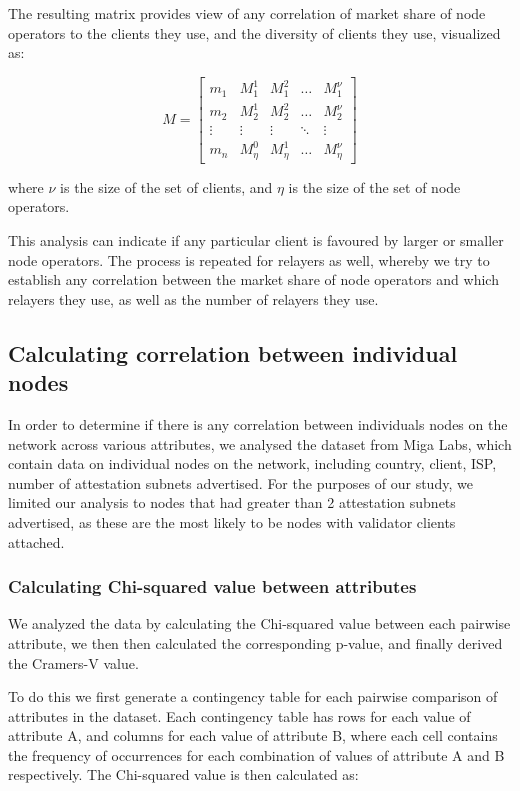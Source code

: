 \documentclass[conference]{IEEEtran}
\begin{document}
The resulting matrix provides view of any correlation of market share of node operators to the clients they use, and the diversity of clients they use, visualized as:

\[
M = \begin{bmatrix}
m_1 & M_1^1 & M_1^2 & \ldots & M_1^{\nu} \\
m_2 & M_2^1 & M_2^2 & \ldots & M_2^{\nu} \\
\vdots & \vdots & \vdots & \ddots & \vdots \\
m_n & M_{\eta}^0 & M_{\eta}^1 & \ldots & M_{\eta}^{\nu}
\end{bmatrix}
\]

where $\nu$ is the size of the set of clients, and $\eta$ is the size of the set of node operators.

This analysis can indicate if any particular client is favoured by larger or smaller node operators. The process is repeated for relayers as well, whereby we try to establish any correlation between the market share of node operators and which relayers they use, as well as the number of relayers they use.

\subsection{Calculating correlation between individual nodes}

In order to determine if there is any correlation between individuals nodes on the network across various attributes, we analysed the dataset from Miga Labs, which contain data on individual nodes on the network, including country, client, ISP, number of attestation subnets advertised. For the purposes of our study, we limited our analysis to nodes that had greater than 2 attestation subnets advertised, as these are the most likely to be nodes with validator clients attached.

\subsubsection{Calculating Chi-squared value between attributes}

We analyzed the data by calculating the Chi-squared value between each pairwise attribute, we then then calculated the corresponding p-value, and finally derived the Cramers-V value.

To do this we first generate a contingency table for each pairwise comparison of attributes in the dataset.  Each contingency table has rows for each value of attribute A, and columns for each value of attribute B, where each cell contains the frequency of occurrences for each combination of values of attribute A and B respectively. The Chi-squared value is then calculated as:
\end{document}
